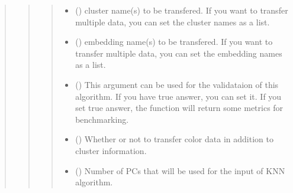 \documentclass[letterpaper,10pt,english]{sphinxmanual}
\begin{document}
\begin{quote}
\begin{quote}
\begin{fulllineitems}
\begin{quote}
\begin{description}
\begin{itemize}
\item {} 
 () \textendash{} cluster name(s) to be transfered. If you want to transfer multiple data, you can set the cluster names as a list.

\item {} 
 () \textendash{} embedding name(s) to be transfered. If you want to transfer multiple data, you can set the embedding names as a list.

\item {} 
 () \textendash{} This argument can be used for the validataion of this algorithm. If you have true answer, you can set it. If you set true answer, the function will return some metrics for benchmarking.

\item {} 
 () \textendash{} Whether or not to transfer color data in addition to cluster information.

\item {} 
 () \textendash{} Number of PCs that will be used for the input of KNN algorithm.

\end{itemize}

\end{description}\end{quote}

\end{fulllineitems}



\end{quote}
\end{quote}
\end{document}

